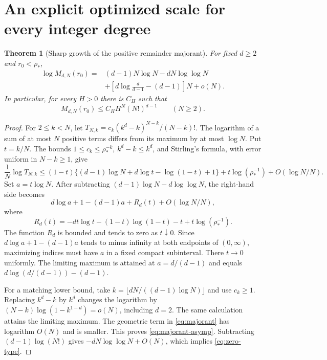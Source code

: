 \documentclass[11pt,a4paper]{article}
\numberwithin{equation}{section}
\newtheorem{theorem}{Theorem}[section]
\theoremstyle{definition}\newtheorem{definition}[theorem]{Definition}
\theoremstyle{remark}\newtheorem{remark}[theorem]{Remark}
\theoremstyle{definition}
\begin{document}
\section{An explicit optimized scale for every integer degree}
\label{sec:optimal}
\begin{theorem}[Sharp growth of the positive remainder majorant]
\label{thm:majorant}
For fixed $d\ge2$ and $r_0<\rho_*$,
\begin{align}
 \log M_{d,N}(r_0)
 ={}&(d-1)N\log N-dN\log\log N\\
 &+\left[d\log\frac{d}{d-1}-(d-1)\right]N+o(N).
 \label{eq:majorant-asymp}
\end{align}
In particular, for every $H>0$ there is $C_H$ such that
\begin{equation}
 M_{d,N}(r_0)\le C_H H^N(N!)^{d-1}\qquad(N\ge2).
 \label{eq:zero-type}
\end{equation}
\end{theorem}
\begin{proof}
For $2\le k<N$, let $T_{N,k}=c_k(k^d-k)^{N-k}/(N-k)!$.
The logarithm of a sum of at most $N$ positive terms differs from its maximum
by at most $\log N$. Put $t=k/N$. The bounds $1\le c_k\le\rho_*^{-k}$,
$k^d-k\le k^d$, and Stirling's formula, with error uniform in $N-k\ge1$,
give
\[
 \frac1N\log T_{N,k}
 \le(1-t)\{(d-1)\log N+d\log t-\log(1-t)+1\}
       +t\log(\rho_*^{-1})+O(\log N/N).
\]
Set $a=t\log N$. After subtracting
$(d-1)\log N-d\log\log N$, the right-hand side becomes
\[
 d\log a+1-(d-1)a+R_d(t)+O(\log N/N),
\]
where
\[
 R_d(t)=-dt\log t-(1-t)\log(1-t)-t+t\log(\rho_*^{-1}).
\]
The function $R_d$ is bounded and tends to zero as $t\downarrow0$.
Since $d\log a+1-(d-1)a$ tends to minus infinity at both endpoints of
$(0,\infty)$, maximizing indices must have $a$ in a fixed compact subinterval.
There $t\to0$ uniformly. The limiting maximum is attained at
$a=d/(d-1)$ and equals
$d\log(d/(d-1))-(d-1)$.

For a matching lower bound, take
$k=\lfloor dN/((d-1)\log N)\rfloor$ and use $c_k\ge1$.
Replacing $k^d-k$ by $k^d$ changes the logarithm by
$(N-k)\log(1-k^{1-d})=o(N)$, including $d=2$.
The same calculation attains the limiting maximum. The geometric term in
\eqref{eq:majorant} has logarithm $O(N)$ and is smaller. This proves
\eqref{eq:majorant-asymp}. Subtracting
$(d-1)\log(N!)$ gives $-dN\log\log N+O(N)$, which implies
\eqref{eq:zero-type}.
\end{proof}
\end{document}
